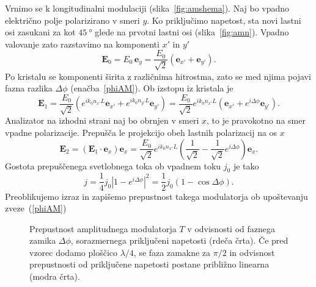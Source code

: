 Vrnimo se k longitudinalni
modulaciji (slika~\ref{fig:amshema}).
Naj bo vpadno električno polje polarizirano v smeri $y$. 
Ko priključimo napetost, sta novi lastni osi zasukani 
za kot $45~\si{\degree}$ glede na prvotni lastni osi (slika~\ref{fig:amn}). Vpadno 
valovanje zato razstavimo na komponenti $x'$ in $y'$
\begin{equation}
\mathbf{E}_0 = E_0\, \mathbf{e}_y = \frac{E_0}{\sqrt{2}}\left(\mathbf{e}_{x'} + \mathbf{e}_{y'}\right).
\end{equation}
Po kristalu se komponenti širita z različnima hitrostma, zato se med njima pojavi 
fazna razlika $\Delta \phi$ 
(enačba~\ref{phiAM}). Ob izstopu iz kristala je 
\begin{equation}
\mathbf{E}_1 = \frac{E_0}{\sqrt{2}}\left(e^{ik_0 n_{x'}L}\mathbf{e}_{x'} + 
e^{ik_0 n_{y'}L}\mathbf{e}_{y'}\right)
= \frac{E_0}{\sqrt{2}}e^{ik_0 n_{x'}L}\left(\mathbf{e}_{x'} + 
e^{i\Delta\phi}\mathbf{e}_{y'}\right).
\end{equation}
Analizator na izhodni strani naj bo obrnjen v smeri $x$, to je pravokotno
na smer vpadne polarizacije. Prepušča le projekcijo obeh lastnih polarizacij
na os $x$
\begin{equation}
\mathbf{E}_2= \left(\mathbf{E}_1 \cdot \mathbf{e}_x\right)\mathbf{e}_x = 
\frac{E_0}{\sqrt{2}}e^{ik_0 n_{x'}L}
\left(\frac{1}{\sqrt{2}} -\frac{1}{\sqrt{2}} e^{i\Delta\phi}\right)\mathbf{e}_x .
\label{7.16}
\end{equation}
Gostota prepuščenega svetlobnega toka ob vpadnem toku $j_0$ je tako 
\begin{equation}
j=\frac{1}{4}j_{0}\left|1-e^{i\Delta\phi}\right|^{2}=\frac{1}{2}j_{0}(1-\cos\Delta\phi).
\label{7.17}
\end{equation}
Preoblikujemo izraz in zapišemo prepustnost takega modulatorja ob upoštevanju 
zveze~(\ref{phiAM})
\begin{figure}[ht]
\centering
\def\svgwidth{70truemm} 

\caption{Prepustnost amplitudnega modulatorja $T$ v odvisnosti od faznega zamika $\Delta \phi$, 
sorazmernega priključeni napetosti (rdeča črta). Če pred vzorec dodamo ploščico $\lambda/4$, 
se faza zamakne za $\pi/2$ in odvisnost prepustnosti od priključene napetosti
postane približno linearna (modra črta).}
\label{fig:amt}
\end{figure}


